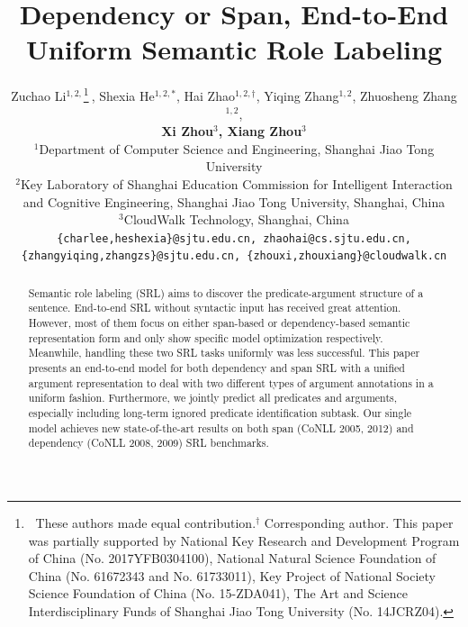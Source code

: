 \documentclass[letterpaper]{article} %
\begin{document}
%
\title{Dependency or Span, End-to-End Uniform Semantic Role Labeling}
\author{Zuchao Li$^{1,2,}$\thanks{$\ $ These authors made equal contribution.$^{\dag}$ Corresponding author. This paper was partially supported by National Key Research and Development Program of China (No. 2017YFB0304100), National Natural Science Foundation of China (No. 61672343 and No. 61733011), Key Project of National Society Science Foundation of China (No. 15-ZDA041), The Art and Science Interdisciplinary Funds of Shanghai Jiao Tong University (No. 14JCRZ04).}$\ $, Shexia He$^{1,2,*}$, Hai Zhao$^{1,2,\dag}$, Yiqing Zhang$^{1,2}$, Zhuosheng Zhang$^{1,2}$, 
	\\  \Large\textbf{Xi Zhou$^{3}$, Xiang Zhou$^{3}$}\\
	$^{1}$Department of Computer Science and Engineering, Shanghai Jiao Tong University \\
	$^{2}$Key Laboratory of Shanghai Education Commission for Intelligent Interaction \\ and Cognitive Engineering, Shanghai Jiao Tong University, Shanghai, China\\
	$^{3}$CloudWalk Technology, Shanghai, China\\
	{\tt \{charlee,heshexia\}@sjtu.edu.cn, zhaohai@cs.sjtu.edu.cn,}\\
	{\tt  \{zhangyiqing,zhangzs\}@sjtu.edu.cn, \{zhouxi,zhouxiang\}@cloudwalk.cn}\\
}
\maketitle
\begin{abstract}
Semantic role labeling (SRL) aims to discover the predicate-argument structure of a sentence. End-to-end SRL without syntactic input has received great attention. However, most of them focus on either span-based or dependency-based semantic representation form and only show specific model optimization respectively. Meanwhile, handling these two SRL tasks uniformly was less successful. This paper presents an end-to-end model for both dependency and span SRL with a unified argument representation to deal with two different types of argument annotations in a uniform fashion. Furthermore, we jointly predict all predicates and arguments, especially including long-term ignored predicate identification subtask. Our single model achieves new state-of-the-art results on both span (CoNLL 2005, 2012) and dependency (CoNLL 2008, 2009) SRL benchmarks. 
 
\end{abstract}
\end{document}
